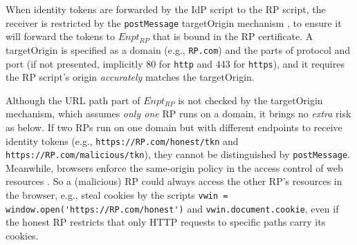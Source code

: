 


\vspace{0.5mm}
When identity tokens are forwarded by the IdP script to the RP script, %
    the receiver is restricted by the \verb+postMessage+ targetOrigin mechanism \cite{postm-targeto},
        to ensure it will forward the tokens to $Enpt_{RP}$
        that is bound in the RP certificate.
A targetOrigin is specified as
    a domain (e.g., \verb+RP.com+) and the parts of protocol and port (if not presented, implicitly 80 for \verb+http+ and 443 for \verb+https+),
        and it requires the RP script's origin \emph{accurately} matches the targetOrigin.

Although the URL path part of $Enpt_{RP}$ %
 is not checked by the targetOrigin mechanism,
  which assumes \emph{only one} RP runs on a domain,
   it brings no \emph{extra} risk as below.
If two RPs run on one domain but with different endpoints to receive identity tokens
        (e.g., \verb+https://RP.com/honest/tkn+ and \verb+https://RP.com/malicious/tkn+),
         they cannot be distinguished by \verb+postMessage+.
Meanwhile, browsers enforce
 the same-origin policy  in the access control of web resources \cite{sop}.
So
    a (malicious) RP could always access the other RP's resources in the browser,
        e.g., steal cookies
        by the scripts
        \verb+vwin = window.open('https://RP.com/honest')+
    and \verb+vwin.document.cookie+,
    even if the honest RP restricts that only HTTP requests to specific paths carry its cookies.

